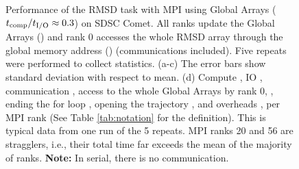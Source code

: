 \begin{figure}[ht!]
\caption{Performance of the RMSD task with MPI using Global Arrays (${t}_{\text{comp}}/{t}_{\text{I/O}} \approx 0.3$) on SDSC Comet.
All ranks update the Global Arrays () and rank 0 accesses the whole RMSD array through the global memory address () (communications included).
Five repeats were performed to collect statistics. (a-c) The error bars show standard deviation with respect to mean. 
(d) Compute \tcomp, IO \tIO, communication \tcomm, access to the whole Global Arrays by rank 0, , ending the for loop ,
  opening the trajectory , and overheads ,  per MPI rank (See Table \ref{tab:notation} for the definition). 
  This is typical data from one run of the 5 repeats. MPI ranks 20 and 56 are stragglers, i.e., 
their total time far exceeds the mean of the majority of ranks. \textbf{Note:} In serial, there is no communication.}
\label{fig:MPIwithIO-ga4py}
\end{figure}

